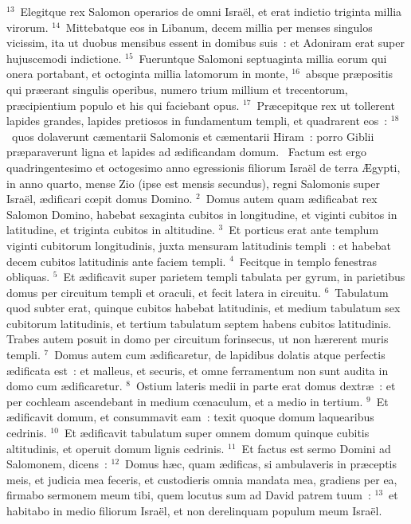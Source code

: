 ${}^{13}$~Elegitque rex Salomon operarios de omni Isra\"el, et erat indictio triginta millia virorum.
${}^{14}$~Mittebatque eos in Libanum, decem millia per menses singulos vicissim, ita ut duobus mensibus essent in domibus suis~: et Adoniram erat super hujuscemodi indictione.
${}^{15}$~Fueruntque Salomoni septuaginta millia eorum qui onera portabant, et octoginta millia latomorum in monte,
${}^{16}$~absque pr\ae positis qui pr\ae erant singulis operibus, numero trium millium et trecentorum, pr\ae cipientium populo et his qui faciebant opus.
${}^{17}$~Pr\ae cepitque rex ut tollerent lapides grandes, lapides pretiosos in fundamentum templi, et quadrarent eos~:
${}^{18}$~quos dolaverunt c\ae mentarii Salomonis et c\ae mentarii Hiram~: porro Giblii pr\ae paraverunt ligna et lapides ad \ae dificandam domum.
~Factum est ergo quadringentesimo et octogesimo anno egressionis filiorum Isra\"el de terra \AE gypti, in anno quarto, mense Zio (ipse est mensis secundus), regni Salomonis super Isra\"el, \ae dificari cœpit domus Domino.
${}^{2}$~Domus autem quam \ae dificabat rex Salomon Domino, habebat sexaginta cubitos in longitudine, et viginti cubitos in latitudine, et triginta cubitos in altitudine.
${}^{3}$~Et porticus erat ante templum viginti cubitorum longitudinis, juxta mensuram latitudinis templi~: et habebat decem cubitos latitudinis ante faciem templi.
${}^{4}$~Fecitque in templo fenestras obliquas.
${}^{5}$~Et \ae dificavit super parietem templi tabulata per gyrum, in parietibus domus per circuitum templi et oraculi, et fecit latera in circuitu.
${}^{6}$~Tabulatum quod subter erat, quinque cubitos habebat latitudinis, et medium tabulatum sex cubitorum latitudinis, et tertium tabulatum septem habens cubitos latitudinis. Trabes autem posuit in domo per circuitum forinsecus, ut non h\ae rerent muris templi.
${}^{7}$~Domus autem cum \ae dificaretur, de lapidibus dolatis atque perfectis \ae dificata est~: et malleus, et securis, et omne ferramentum non sunt audita in domo cum \ae dificaretur.
${}^{8}$~Ostium lateris medii in parte erat domus dextr\ae~: et per cochleam ascendebant in medium cœnaculum, et a medio in tertium.
${}^{9}$~Et \ae dificavit domum, et consummavit eam~: texit quoque domum laquearibus cedrinis.
${}^{10}$~Et \ae dificavit tabulatum super omnem domum quinque cubitis altitudinis, et operuit domum lignis cedrinis.
${}^{11}$~Et factus est sermo Domini ad Salomonem, dicens~:
${}^{12}$~Domus h\ae c, quam \ae dificas, si ambulaveris in pr\ae ceptis meis, et judicia mea feceris, et custodieris omnia mandata mea, gradiens per ea, firmabo sermonem meum tibi, quem locutus sum ad David patrem tuum~:
${}^{13}$~et habitabo in medio filiorum Isra\"el, et non derelinquam populum meum Isra\"el.


